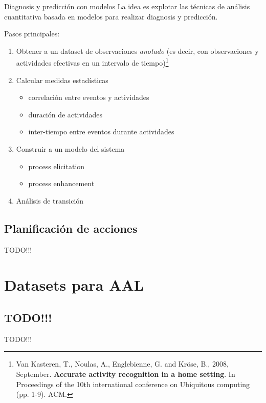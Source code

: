 \documentclass[9pt]{beamer}
\begin{document}
      \begin{frame}{Diagnosis y predicción con modelos}
        \pause
        La idea es explotar las técnicas de análisis cuantitativa basada en modelos para realizar diagnosis y predicción.\\[1em]
        
        \pause
        
        Pasos principales:
        \pause
        \begin{enumerate}
          \item Obtener a un dataset de observaciones \textit{anotado} (es decir, con observaciones y actividades efectivas en un intervalo de tiempo)\footnote{Van Kasteren, T., Noulas, A., Englebienne, G. and Kröse, B., 2008, September. \textbf{Accurate activity recognition in a home setting}. In Proceedings of the 10th international conference on Ubiquitous computing (pp. 1-9). ACM.}
          \pause
          \item Calcular medidas estadísticas
          \begin{itemize}
            \item correlación entre eventos y actividades
            \item duración de actividades
            \item inter-tiempo entre eventos durante actividades
          \end{itemize}
          \pause
          \item Construir a un modelo del sistema
          \begin{itemize}
            \item process elicitation
            \item process enhancement
          \end{itemize}
          \pause
          \item Análisis de transición
        \end{enumerate}
      \end{frame}
        
    \subsection{Planificación de acciones}
      \begin{frame}{TODO!!!}
      \end{frame}
            
  \section{Datasets para AAL}
    
    \subsection{TODO!!!}
      \begin{frame}{TODO!!!}
      \end{frame}
\end{document}
